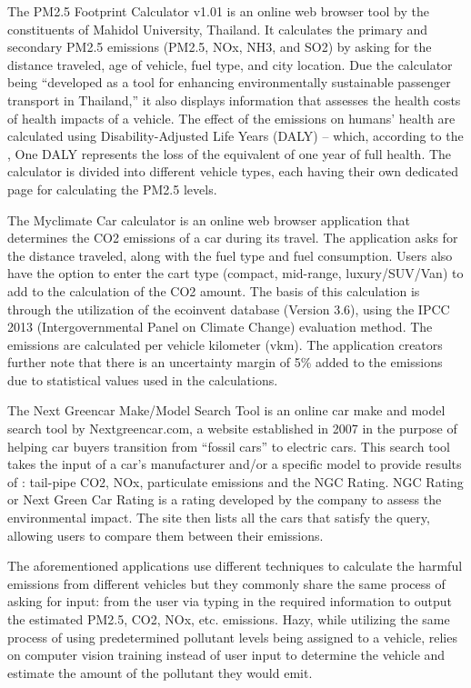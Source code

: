 	The PM2.5 Footprint Calculator v1.01 is an online web browser tool by the constituents of Mahidol University, Thailand. It calculates the primary and secondary PM2.5 emissions (PM2.5, NOx, NH3, and SO2) by asking for the distance traveled, age of vehicle, fuel type, and city location. Due the calculator being “developed as a tool for enhancing environmentally sustainable passenger transport in Thailand,” it also displays information that assesses the health costs of health impacts of a vehicle. The effect of the emissions on humans’ health are calculated using  Disability-Adjusted Life Years (DALY) – which, according to the \cite{WHO_nd}, One DALY represents the loss of the equivalent of one year of full health. The calculator is divided into different vehicle types, each having their own dedicated page for calculating the PM2.5 levels. \cite{pm25_footprint}
	
	

	The Myclimate Car calculator is an online web browser application that determines the CO2 emissions of a car during its travel. The application asks for the distance traveled, along with the fuel type and fuel consumption. Users also have the option to enter the cart type (compact, mid-range, luxury/SUV/Van) to add to the calculation of the CO2 amount.  The basis of this calculation is through the utilization of the ecoinvent database (Version 3.6), using the IPCC 2013  (Intergovernmental Panel on Climate Change) evaluation method. The emissions are calculated per vehicle kilometer (vkm). The application creators further note that there is an uncertainty margin of 5\% added to the emissions due to statistical values used in the calculations. \cite{MCF_ND}

	The Next Greencar Make/Model Search Tool is an online car make and model search tool by Nextgreencar.com, a website established in 2007 in the purpose of helping car buyers transition from “fossil cars” to electric cars. This search tool takes the input of a car’s manufacturer and/or a specific model to provide results of : tail-pipe CO2, NOx, particulate emissions and the NGC Rating. NGC Rating or Next Green Car Rating is a rating developed by the company to assess the environmental impact. \cite{Lilly_ND}  The site then lists all the cars that satisfy the query, allowing users to compare them between their emissions. 

	The aforementioned applications use different techniques to calculate the harmful emissions from different vehicles but they commonly share the same process of asking for input: from the user via typing in the required information to output the estimated PM2.5, CO2, NOx, etc. emissions. Hazy, while utilizing the same process of using predetermined pollutant levels being assigned to a vehicle, relies on computer vision training instead of user input to determine the vehicle and estimate the amount of the pollutant they would emit.

